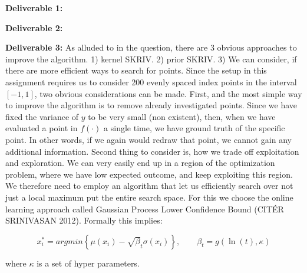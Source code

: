 \textbf{Deliverable 1:}

\textbf{Deliverable 2:}

\textbf{Deliverable 3:} As alluded to in the question, there are 3 obvious approaches to improve the algorithm. 1) kernel SKRIV. 2) prior SKRIV. 3) We can consider, if there are more efficient ways to search for points. Since the setup in this assignment requires us to consider 200 evenly spaced index points in the interval $[-1, 1]$, two obvious considerations can be made. First, and the most simple way to improve the algorithm is to remove already investigated points. Since we have fixed the variance of $y$ to be very small (non existent), then, when we have evaluated a point in $f(\cdot) $ a single time, we have ground truth of the specific point. In other words, if we again would redraw that point, we cannot gain any additional information. Second thing to consider is, how we trade off exploitation and exploration. We can very easily end up in a region of the optimization problem, where we have low expected outcome, and keep exploiting this region. We therefore need to employ an algorithm that let us efficiently search over not just a local maximum put the entire search space. For this we choose the online learning approach called Gaussian Process Lower Confidence Bound (CITÉR SRINIVASAN 2012). Formally this implies:

\begin{equation}
    x_i^* = argmin \left\{ \mu(x_i) - \sqrt{\beta}_t \sigma(x_i)\right\}, \qquad \beta_t = g(\ln(t), \kappa)
\end{equation}

where $\kappa$ is a set of hyper parameters.

\fi